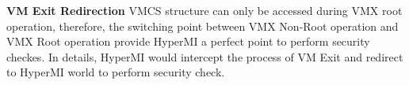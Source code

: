 \documentclass[conference]{IEEEtran}
\begin{document}
\textbf{VM Exit Redirection}
VMCS structure can only be accessed during VMX root operation, therefore, the switching point between VMX Non-Root operation and VMX Root operation provide HyperMI a perfect point to perform security checkes. In details, HyperMI would intercept the process of VM Exit and redirect to HyperMI world to perform security check. 
%
%
\end{document}
